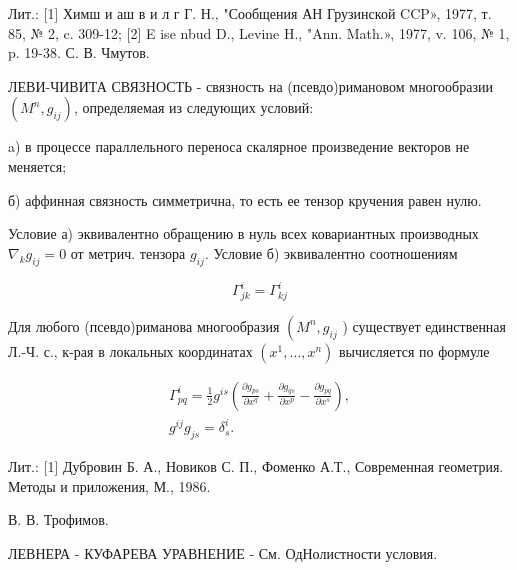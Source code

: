 \documentclass[10pt]{article}
\begin{document}
Лит.: [1] Химш и аш в и л г Г. Н., "Сообщения АН Грузинской CCP», 1977, т. 85, № 2, c. 309-12; [2] E ise nbud D., Levine H., "Ann. Math.», 1977, v. 106, № 1, p. 19-38. С. В. Чмутов.



ЛЕВИ-ЧИВИТА СВЯЗНОСТЬ - связность на (псевдо)римановом многообразии $\left(M^{n}, g_{i j}\right)$, определяемая из следующих условий:



a) в процессе параллельного переноса скалярное произведение векторов не меняется;



б) аффинная связность симметрична, то есть ее тензор кручения равен нулю.



Условие а) эквивалентно обращению в нуль всех ковариантных производных $\nabla_{k} g_{i j}=0$ от метрич. тензора $g_{i j}$. Условие б) эквивалентно соотношениям



\[

\Gamma_{j k}^{i}=\Gamma_{k j}^{i}

\]



Для любого (псевдо)риманова многообразия $\left(M^{n}, g_{i j}\right.$ ) существует единственная Л.-Ч. с., к-рая в локальных координатах $\left(x^{1}, \ldots, x^{n}\right)$ вычисляется по формуле



\[

\begin{gathered}

\Gamma_{p q}^{i}=\frac{1}{2} g^{i s}\left(\frac{\partial g_{p s}}{\partial x^{q}}+\frac{\partial g_{q s}}{\partial x^{p}}-\frac{\partial g_{p q}}{\partial x^{s}}\right), \\

g^{i j} g_{j s}=\delta_{s}^{i} .

\end{gathered}

\]



Лит.: [1] Дубровин Б. А., Новиков С. П., Фоменко А.Т., Современная геометрия. Методы и приложения, М., 1986.



В. В. Трофимов.



ЛЕВНЕРА - КУФАРЕВА УРАВНЕНИЕ - См. ОдНолистности условия.
\end{document}

